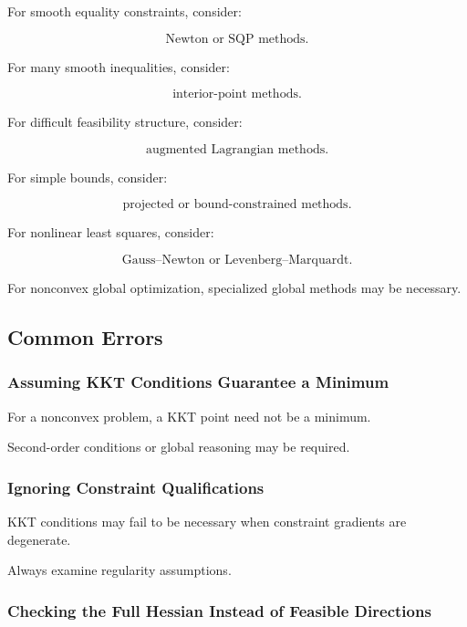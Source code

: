 For smooth equality constraints, consider:

\[
\boxed{
\text{Newton or SQP methods}.
}
\]

For many smooth inequalities, consider:

\[
\boxed{
\text{interior-point methods}.
}
\]

For difficult feasibility structure, consider:

\[
\boxed{
\text{augmented Lagrangian methods}.
}
\]

For simple bounds, consider:

\[
\boxed{
\text{projected or bound-constrained methods}.
}
\]

For nonlinear least squares, consider:

\[
\boxed{
\text{Gauss--Newton or Levenberg--Marquardt}.
}
\]

For nonconvex global optimization, specialized global methods may be
necessary.

\subsection{Common Errors}
\label{subsec:nonlinear-programming-common-errors}

\subsubsection{Assuming KKT Conditions Guarantee a Minimum}

For a nonconvex problem, a KKT point need not be a minimum.

Second-order conditions or global reasoning may be required.

\subsubsection{Ignoring Constraint Qualifications}

KKT conditions may fail to be necessary when constraint gradients are
degenerate.

Always examine regularity assumptions.

\subsubsection{Checking the Full Hessian Instead of Feasible Directions}


